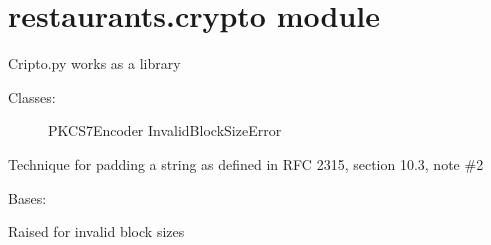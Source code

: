 \documentclass[letterpaper,10pt,english]{sphinxmanual}
\begin{document}
\section{restaurants.crypto module}
\label{restaurants:module-restaurants.crypto}\label{restaurants:restaurants-crypto-module}
Cripto.py works as a library
\begin{description}
\item[{Classes:}] \leavevmode
PKCS7Encoder
InvalidBlockSizeError

\end{description}

\begin{fulllineitems}
\label{restaurants:restaurants.crypto.PKCS7Encoder}
Technique for padding a string as defined in RFC 2315, section 10.3, note \#2

\begin{fulllineitems}
\label{restaurants:restaurants.crypto.PKCS7Encoder.InvalidBlockSizeError}
Bases: \href{http://docs.python.org/library/exceptions.html\#exceptions.Exception}{}

Raised for invalid block sizes

\end{fulllineitems}


\begin{fulllineitems}
\label{restaurants:restaurants.crypto.PKCS7Encoder.encode}
\end{fulllineitems}


\begin{fulllineitems}
\label{restaurants:restaurants.crypto.PKCS7Encoder.decode}
\end{fulllineitems}


\end{fulllineitems}

\end{document}
